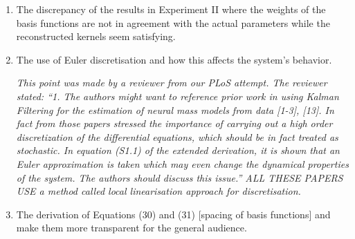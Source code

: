\documentclass{article}
\begin{document}
    \begin{enumerate}
        \item The discrepancy of the results in Experiment II where the weights of the basis functions are not in agreement with the actual parameters while the reconstructed kernels seem satisfying.

        \item The use of Euler discretisation and how this affects the system's behavior.

		\emph{This point was made by a reviewer from our PLoS attempt. The reviewer stated: ``1. The authors might want to reference prior work in using Kalman
		Filtering for the estimation of neural mass models from data [1-3],
		[13]. In fact from those papers stressed the importance of carrying out
		a high order discretization of the differential equations, which should
		be in fact treated as stochastic. In equation (S1.1) of the extended
		derivation, it is shown that an Euler approximation is taken which may
		even change the dynamical properties of the system. The authors should
		discuss this issue.'' ALL THESE PAPERS USE a method called local linearisation approach for discretisation.}
		
        \item The derivation of Equations (30) and (31) [spacing of basis functions] and make them more transparent for the general audience.


\end{enumerate}
\end{document}
